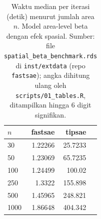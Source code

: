 \begin{table}[htbp]
\centering
\caption{Waktu median per iterasi (detik) menurut jumlah area $n$. Model area-level beta dengan efek spasial. Sumber: file \texttt{spatial\_beta\_benchmark.rds} di \texttt{inst/extdata} (repo \texttt{fastsae}); angka dihitung ulang oleh \texttt{scripts/01\_tables.R}, ditampilkan hingga 6 digit signifikan.}
\label{tab:time-sbeta}
\small
\begin{tabular}{lrrr}
\toprule
$n$ & fastsae & tipsae \\
\midrule
30 & 1.22266 & 25.7233 \\
50 & 1.23069 & 65.7235 \\
100 & 1.24499 &  100.02 \\
250 &  1.3322 & 155.898 \\
500 & 1.45965 & 248.821 \\
1000 & 1.86648 & 404.342 \\
\bottomrule
\end{tabular}
\end{table}

